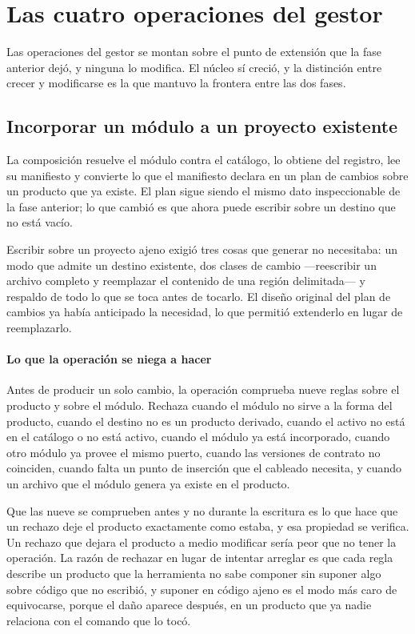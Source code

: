 \section{Las cuatro operaciones del gestor}
\label{sec:gestor-modulos}

Las operaciones del gestor se montan sobre el punto de extensión que la fase
anterior dejó, y ninguna lo modifica. El núcleo sí creció, y la distinción
entre crecer y modificarse es la que mantuvo la frontera entre las dos fases.

\subsection{Incorporar un módulo a un proyecto existente}
\label{sec:composicion}

La composición resuelve el módulo contra el catálogo, lo obtiene del
registro, lee su manifiesto y convierte lo que el manifiesto declara en un
plan de cambios sobre un producto que ya existe. El plan sigue siendo el
mismo dato inspeccionable de la fase anterior; lo que cambió es que ahora
puede escribir sobre un destino que no está vacío.

Escribir sobre un proyecto ajeno exigió tres cosas que generar no
necesitaba: un modo que admite un destino existente, dos clases de cambio
—reescribir un archivo completo y reemplazar el contenido de una región
delimitada— y respaldo de todo lo que se toca antes de tocarlo. El diseño
original del plan de cambios ya había anticipado la necesidad, lo que
permitió extenderlo en lugar de reemplazarlo.

\paragraph*{Lo que la operación se niega a hacer}

Antes de producir un solo cambio, la operación comprueba nueve reglas sobre
el producto y sobre el módulo. Rechaza cuando el módulo no sirve a la forma
del producto, cuando el destino no es un producto derivado, cuando el activo
no está en el catálogo o no está activo, cuando el módulo ya está
incorporado, cuando otro módulo ya provee el mismo puerto, cuando las
versiones de contrato no coinciden, cuando falta un punto de inserción que el
cableado necesita, y cuando un archivo que el módulo genera ya existe en el
producto.

Que las nueve se comprueben antes y no durante la escritura es lo que hace
que un rechazo deje el producto exactamente como estaba, y esa propiedad se
verifica. Un rechazo que dejara el producto a medio modificar sería peor que
no tener la operación. La razón de rechazar en lugar de intentar arreglar es
que cada regla describe un producto que la herramienta no sabe componer sin
suponer algo sobre código que no escribió, y suponer en código ajeno es el
modo más caro de equivocarse, porque el daño aparece después, en un producto
que ya nadie relaciona con el comando que lo tocó.


